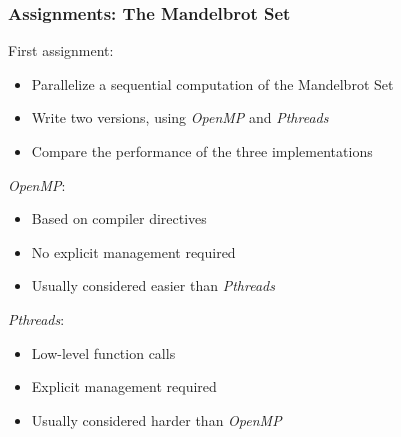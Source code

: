\documentclass[10pt, compress, aspectratio=169]{beamer}
\begin{document}
\begin{frame}
    \frametitle{Assignments: The Mandelbrot Set}
    First assignment:

    \begin{itemize}
        \item Parallelize a sequential computation of the Mandelbrot Set
        \item Write two versions, using \textit{OpenMP} and \textit{Pthreads}
        \item Compare the performance of the three implementations
    \end{itemize}

    \textit{OpenMP}:
    \begin{itemize}
        \item Based on compiler directives
        \item No explicit management required
        \item Usually considered easier than \textit{Pthreads}
    \end{itemize}

    \textit{Pthreads}:
    \begin{itemize}
        \item Low-level function calls
        \item Explicit management required
        \item Usually considered harder than \textit{OpenMP}
    \end{itemize}
\end{frame}
\end{document}
